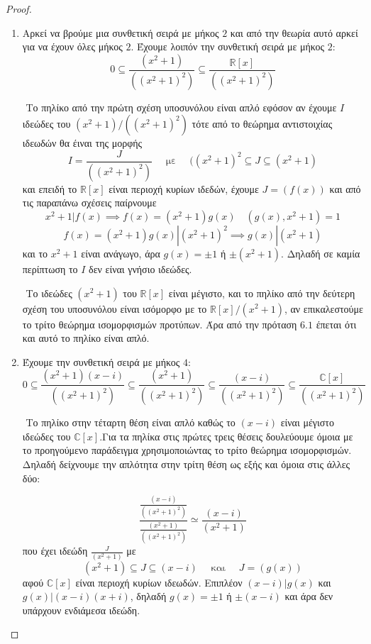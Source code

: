 \documentclass[oneside,a4paper]{article}
\begin{document}
	\vspace*{1cm}
\begin{proof} $ $

	\begin{enumerate}
		\item Αρκεί να βρούμε μια συνθετική σειρά με μήκος $2$ και από την θεωρία αυτό αρκεί για να έχουν όλες μήκος $2$. Έχουμε λοιπόν την συνθετική σειρά με μήκος $2$:
		$$0 \subseteq \frac{(x^2+1)}{((x^2+1)^2)} \subseteq \frac{\mathbb{R}[x]}{((x^2+1)^2)}$$
		
		$ $\newline
		Το πηλίκο από την πρώτη σχέση υποσυνόλου είναι απλό εφόσον αν έχουμε $I$ ιδεώδες του $(x^2+1)/((x^2+1)^2)$ τότε από το θεώρημα αντιστοιχίας ιδεωδών θα έιναι της μορφής
		$$I = \frac{J}{((x^2+1)^2)} \quad \text{ με } \quad ((x^2+1)^2 \subseteq J \subseteq (x^2+1)$$
		και επειδή το $\mathbb{R}[x]$ είναι περιοχή κυρίων ιδεδών, έχουμε $J = (f(x))$ και από τις παραπάνω σχέσεις παίρνουμε 
		$$x^2 + 1 | f(x) \implies f(x) = (x^2+1)g(x) \quad (g(x),x^2+1) =1$$
		$$f(x) = (x^2+1)g(x) | (x^2+1)^2 \implies g(x)|(x^2+1)$$
		και το  $x^2 + 1$ είναι ανάγωγο, άρα $g(x) = \pm1$ ή $\pm(x^2+1)$. Δηλαδή σε καμία περίπτωση το $I$ δεν είναι γνήσιο ιδεώδες.

		$ $\newline
		Το ιδεώδες $(x^2+1)$ του $\mathbb{R}[x]$ είναι μέγιστο, και το πηλίκο από την δεύτερη σχέση του υποσυνόλου είναι ισόμορφο με το $\mathbb{R}[x]/(x^2+1)$, αν επικαλεστούμε το τρίτο θεώρημα ισομορφισμών προτύπων. Άρα από την πρόταση $6.1$ έπεται ότι και αυτό το πηλίκο είναι απλό.

		\item Έχουμε την συνθετική σειρά με μήκος $4$:
		$$0 \subseteq \frac{(x^2+1)(x-i)}{((x^2+1)^2)} \subseteq \frac{(x^2+1)}{((x^2+1)^2)} \subseteq \frac{(x-i)}{((x^2+1)^2)} \subseteq \frac{\mathbb{C}[x]}{((x^2+1)^2)}$$
		
		$ $\newline
		Το πηλίκο στην τέταρτη θέση είναι απλό καθώς το $(x-i)$ είναι μέγιστο ιδεώδες του $\mathbb{C}[x]$.Για τα πηλίκα στις πρώτες τρεις θέσεις δουλεύουμε όμοια με το προηγούμενο παράδειγμα χρησιμοποιώντας το τρίτο θεώρημα ισομορφισμών. Δηλαδή δείχνουμε την απλότητα στην τρίτη θέση ως εξής και όμοια στις άλλες δύο:

		$$\frac{\frac{(x-i)}{((x^2+1)^2)}}{\frac{(x^2+1)}{((x^2+1)^2)}} \simeq \frac{(x-i)}{(x^2+1)}$$
		που έχει ιδεώδη $\frac{J}{(x^2+1)}$ με $$(x^2+1) \subseteq J \subseteq (x-i) \quad \text{ και } \quad J = (g(x))$$
		αφού $\mathbb{C}[x]$ είναι περιοχή κυρίων ιδεωδών. Επιπλέον $(x-i) | g(x) $ και $g(x) | (x-i)(x+i)$, δηλαδή $g(x) = \pm1$ ή $\pm(x-i)$ και άρα δεν υπάρχουν ενδιάμεσα ιδεώδη.


\end{enumerate}
\end{proof}
\end{document}
